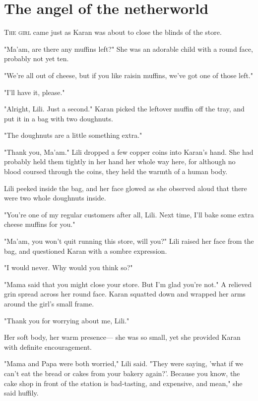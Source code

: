 
\chapter{The angel of the netherworld}


\lettrine{T}{he girl} came just as Karan was about to close the blinds of the store.

"Ma'am, are there any muffins left?" She was an adorable child with a
round face, probably not yet ten.

"We're all out of cheese, but if you like raisin muffins, we've got one
of those left."

"I'll have it, please."

"Alright, Lili. Just a second." Karan picked the leftover muffin off the
tray, and put it in a bag with two doughnuts.

"The doughnuts are a little something extra."

"Thank you, Ma'am." Lili dropped a few copper coins into Karan's hand.
She had probably held them tightly in her hand her whole way here, for
although no blood coursed through the coins, they held the warmth of a
human body.

Lili peeked inside the bag, and her face glowed as she observed aloud
that there were two whole doughnuts inside.

"You're one of my regular customers after all, Lili. Next time, I'll
bake some extra cheese muffins for you."

"Ma'am, you won't quit running this store, will you?" Lili raised her
face from the bag, and questioned Karan with a sombre expression.

"I would never. Why would you think so?"

"Mama said that you might close your store. But I'm glad you're not." A
relieved grin spread across her round face. Karan squatted down and
wrapped her arms around the girl's small frame.

"Thank you for worrying about me, Lili."

Her soft body, her warm presence--- she was so small, yet she provided
Karan with definite encouragement.

"Mama and Papa were both worried," Lili said. "They were saying, 'what
if we can't eat the bread or cakes from your bakery again?'. Because you
know, the cake shop in front of the station is bad-tasting, and
expensive, and mean," she said huffily.

